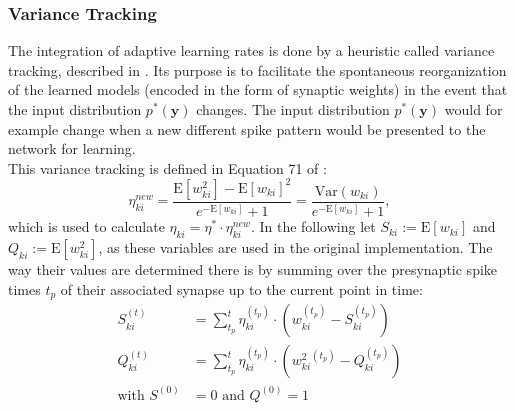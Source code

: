 \subsubsection{Variance Tracking} \label{sec:variance_tracking}
The integration of adaptive learning rates is done by a heuristic called variance tracking, described in \parencite{nessler_et_al_2013}. Its purpose is to facilitate the spontaneous reorganization of the learned models (encoded in the form of synaptic weights) in the event that the input distribution $p^*(\mathbf{y})$ changes. The input distribution $p^*(\mathbf{y})$ would for example change when a new different spike pattern would be presented to the network for learning.\\
This variance tracking is defined in Equation 71 of \parencite{nessler_et_al_2013}:
\begin{equation}
    \eta_{ki}^{new} = \frac{ \text{E}[w_{ki}^2] - \text{E}[w_{ki}]^2 }{ e^{-\text{E}[w_{ki}]} + 1 } 
    = \frac{ \text{Var}(w_{ki}) }{ e^{-\text{E}[w_{ki}]} + 1 },
    \label{eqn:variance_tracking}
\end{equation}
which is used to calculate $\eta_{ki}=\eta^*\cdot \eta_{ki}^{new}$. In the following let $S_{ki}:=\text{E}[w_{ki}]$ and $Q_{ki}:=\text{E}[w_{ki}^2]$, as these variables are used in the original implementation. The way their values are determined there is by summing over the presynaptic spike times $t_p$ of their associated synapse up to the current point in time:
\begin{equation}
\begin{aligned}
    S_{ki}^{(t)} &= \sum_{t_p}^t \eta_{ki}^{(t_p)} \cdot (w_{ki}^{(t_p)}-S_{ki}^{(t_p)})\\
    Q_{ki}^{(t)} &= \sum_{t_p}^t \eta_{ki}^{(t_p)} \cdot (w_{ki}^2 {}^{(t_p)}-Q_{ki}^{(t_p)})\\
    \text{with } S^{(0)}&=0 \text{ and } Q^{(0)}=1
\end{aligned}
\label{eqn:variance_tracking_2}
\end{equation}

